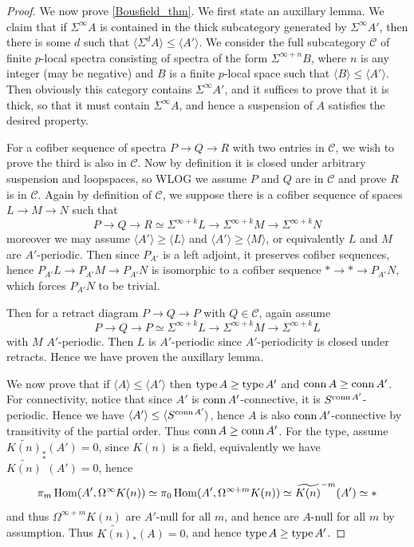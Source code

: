 	\begin{proof}
		We now prove \cref{Bousfield_thm}. We first state an auxillary lemma. We claim that if $\Sigma^\infty A$ is contained in the thick subcategory generated by $\Sigma^\infty A'$, then there is some $d$ such that $\langle\Sigma^dA\rangle\leq\langle A'\rangle$. We consider the full subcategory $\mathcal{C}$ of finite $p$-local spectra consisting of spectra of the form $\Sigma^{\infty+n}B$, where $n$ is any integer (may be negative) and $B$ is a finite $p$-local space such that $\langle B\rangle\leq\langle A'\rangle$. Then obviously this category contains $\Sigma^\infty A'$, and it suffices to prove that it is thick, so that it must contain $\Sigma^\infty A$, and hence a suspension of $A$ satisfies the desired property. 

		For a cofiber sequence of spectra $P\to Q\to R$ with two entries in $\mathcal{C}$, we wish to prove the third is also in $\mathcal{C}$. Now by definition it is closed under arbitrary suspension and loopspaces, so WLOG we assume $P$ and $Q$ are in $\mathcal{C}$ and prove $R$ is in $\mathcal{C}$. Again by definition of $\mathcal{C}$, we suppose there is a cofiber sequence of spaces $L\to M\to N$ such that 
		\[ P\to Q\to R\simeq\Sigma^{\infty+k}L\to\Sigma^{\infty+k}M\to\Sigma^{\infty+k}N \]
		moreover we may assume $\langle A'\rangle\geq\langle L\rangle$ and $\langle A'\rangle\geq\langle M\rangle$, or equivalently $L$ and $M$ are $A'$-periodic. Then since $P_{A'}$ is a left adjoint, it preserves cofiber sequences, hence $P_{A'}L\to P_{A'}M\to P_{A'}N$ is isomorphic to a cofiber sequence $*\to *\to P_{A'}N$, which forces $P_{A'}N$ to be trivial. 

		Then for a retract diagram $P\to Q\to P$ with $Q\in\mathcal{C}$, again assume 
		\[ P\to Q\to P\simeq\Sigma^{\infty+k}L\to\Sigma^{\infty+k}M\to\Sigma^{\infty+k}L \]
		with $M$ $A'$-periodic. Then $L$ is $A'$-periodic since $A'$-periodicity is closed under retracts. Hence we have proven the auxillary lemma. 

		We now prove that if $\langle A\rangle\leq\langle A'\rangle$ then $\operatorname{\mathrm{type}} A\geq\operatorname{\mathrm{type}} A'$ and $\operatorname{\mathrm{conn}} A\geq\operatorname{\mathrm{conn}} A'$. For connectivity, notice that since $A'$ is $\operatorname{\mathrm{conn}} A'$-connective, it is $S^{\operatorname{\mathrm{conn}} A'}$-periodic. Hence we have $\langle A'\rangle\leq\langle S^{\operatorname{\mathrm{conn}} A'}\rangle$, hence $A$ is also $\operatorname{\mathrm{conn}} A'$-connective by transitivity of the partial order. Thus $\operatorname{\mathrm{conn}} A\geq\operatorname{\mathrm{conn}} A'$. For the type, assume $\widetilde{K(n)}_*(A')=0$, since $K(n)$ is a field, equivalently we have $\widetilde{K(n)}^*(A')=0$, hence 
		\[ \pi_m\operatorname{\mathrm{Hom}}(A',\Omega^\infty K(n))\simeq\pi_0\operatorname{\mathrm{Hom}}(A',\Omega^{\infty+m}K(n))\simeq\widetilde{K(n)}^{-m}(A')\simeq* \]
		and thus $\Omega^{\infty+m}K(n)$ are $A'$-null for all $m$, and hence are $A$-null for all $m$ by assumption. Thus $\widetilde{K(n)}_*(A)=0$, and hence $\operatorname{\mathrm{type}} A\geq\operatorname{\mathrm{type}} A'$. 


\end{proof}
